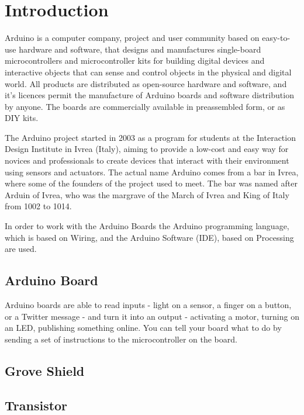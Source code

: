 \section{Introduction}
Arduino is a computer company, project and user community based on easy-to-use hardware and software, that designs and manufactures single-board microcontrollers and microcontroller kits for building digital devices and interactive objects that can sense and control objects in the physical and digital world. All products are distributed as open-source hardware and software, and it's licences permit the manufacture of Arduino boards and software distribution by anyone. The boards are commercially available in preassembled form, or as \ac{DIY} kits.\par

The Arduino project started in 2003 as a program for students at the Interaction Design Institute in Ivrea (Italy), aiming to provide a low-cost and easy way for novices and professionals to create devices that interact with their environment using sensors and actuators. The actual name Arduino comes from a bar in Ivrea, where some of the founders of the project used to meet. The bar was named after Arduin of Ivrea, who was the margrave of the March of Ivrea and King of Italy from 1002 to 1014.\par

In order to work with the Arduino Boards the Arduino programming language, which is based on Wiring, and the Arduino Software (\ac{IDE}), based on Processing are used.

\subsection{Arduino Board}
Arduino boards are able to read inputs - light on a sensor, a finger on a button, or a Twitter
message - and turn it into an output - activating a motor, turning on an LED, publishing something online. You can tell your board what to do by sending a set of instructions to the microcontroller on the board.

\subsection{Grove Shield}

\subsection{Transistor}

